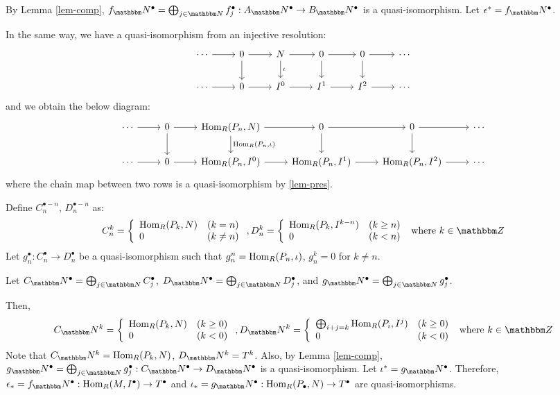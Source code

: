 By Lemma \ref{lem-comp},
\(f_\bbN^\bullet = \bigoplus_{j \in \bbN} f_j^\bullet: A_\bbN^\bullet \to B_\bbN^\bullet\)
is a quasi-isomorphism.
Let \(\epsilon^* = f_\bbN^\bullet\).

\br
\noindent
In the same way, we have a quasi-isomorphism from an injective resolution:
\[\begin{tikzcd}
  \cdots \ar{r} & 0 \ar{d} \ar{r} & N \ar["\iota"]{d} \ar{r} & 0 \ar{d} \ar{r} & 0 \ar{d} \ar{r} & \cdots \\
  \cdots \ar{r} & 0 \ar{r} & I^0 \ar{r} & I^1 \ar{r} & I^2 \ar{r} & \cdots
\end{tikzcd}\]
and we obtain the below diagram:
\[\begin{tikzcd}
  \cdots \ar{r} & 0 \ar{d} \ar{r} & \Hom_R(P_n, N) \ar["\Hom_R(P_n{,} \iota)"]{d} \ar{r} & 0 \ar{d} \ar{r} & 0 \ar{d} \ar{r} & \cdots \\
  \cdots \ar{r} & 0 \ar{r} & \Hom_R(P_n, I^0) \ar{r} & \Hom_R(P_n, I^1) \ar{r} & \Hom_R(P_n, I^2) \ar{r} & \cdots
\end{tikzcd}\]
where the chain map between two rows is a quasi-isomorphism
by \ref{lem-pres}.

Define \(C_n^{\bullet - n}\), \(D_n^{\bullet - n}\) as:
\[C_n^k = \left\{\begin{array}{ll}
\Hom_R(P_k, N) & (k = n) \\
0 & (k \neq n) \\
\end{array}\right.
,
D_n^k = \left\{\begin{array}{ll}
\Hom_R(P_k, I^{k - n}) & (k \ge n) \\
0 & (k < n) \\
\end{array}\right.
\text{ where }
k \in \bbZ
\]
Let \(g_n^\bullet: C_n^\bullet \to D_n^\bullet\) be a quasi-isomorphism
such that
\(g_n^n = \textnormal{Hom}_R(P_n, \iota)\), \(g_n^k = 0\) for \(k \neq n\).

Let
\(C_\bbN^\bullet = \bigoplus_{j\in\bbN} C_j^\bullet\),
\(D_\bbN^\bullet = \bigoplus_{j\in\bbN} D_j^\bullet\),
and
\(g_\bbN^\bullet = \bigoplus_{j\in\bbN} g_j^\bullet\).

Then,
\[C_\bbN^k = \left\{\begin{array}{ll}
\Hom_R(P_k, N) & (k \ge 0) \\
0 & (k < 0) \\
\end{array}\right.
,
D_\bbN^k = \left\{\begin{array}{ll}
\bigoplus_{i+j=k} \Hom_R(P_i, I^j) & (k \ge 0) \\
0 & (k < 0) \\
\end{array}\right.
\text{ where }
k \in \bbZ
\]
Note that
\(C_\bbN^k = \Hom_R(P_k, N)\),
\(D_\bbN^k = T^k\).
Also, by Lemma \ref{lem-comp},
\(g_\bbN^\bullet = \bigoplus_{j \in \bbN} g_j^\bullet: C_\bbN^\bullet \to D_\bbN^\bullet\)
is a quasi-isomorphism.
Let \(\iota^* = g_\bbN^\bullet\).
\br
\noindent
Therefore,
\(\epsilon_* = f_\bbN^\bullet: \Hom_R(M, I^\bullet) \to T^\bullet\)
and
\(\iota_* = g_\bbN^\bullet: \Hom_R(P_\bullet, N) \to T^\bullet\)
are quasi-isomorphisms.
\qedsq